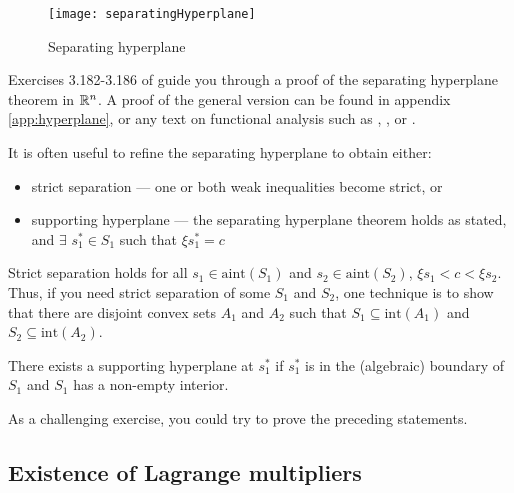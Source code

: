 \begin{figure}\caption{Separating hyperplane \label{fig:sht}}
  \begin{centering}
    \texttt{[image: separatingHyperplane]}
  \end{centering}
\end{figure}

Exercises 3.182-3.186 of \cite{carter2001} guide you through a proof
of the separating hyperplane theorem in $\mathbb{R}^n$. A proof of the general
version can be found in appendix \ref{app:hyperplane}, or any text on
functional analysis such as \cite{luenberger1969}, \cite{clarke2013},
or \cite{holmes1975}. 

\begin{remark}
  It is often useful to refine the separating hyperplane to obtain
  either:
  \begin{itemize}
  \item strict separation --- one or both weak inequalities become
    strict, or 
  \item supporting hyperplane --- the separating hyperplane theorem
    holds as stated, and $\exists$ $s^*_1 \in S_1$ such that $\xi
    s^*_1 = c$
  \end{itemize}
  Strict separation holds for all $s_1 \in \mathrm{aint}(S_1)$ and $s_2
  \in \mathrm{aint}(S_2)$, $\xi s_1 < c < \xi s_2$. Thus, if you need
  strict separation of some $S_1$ and $S_2$, one technique is to show
  that there are disjoint convex sets $A_1$ and $A_2$ such that $S_1
  \subseteq \mathrm{int}(A_1)$ and $S_2 \subseteq \mathrm{int}(A_2)$.

  There exists a supporting hyperplane at $s_1^*$ if $s_1^*$ is in the
  (algebraic) boundary of $S_1$ and $S_1$ has a non-empty interior.

  As a challenging exercise, you could try to prove the preceding
  statements. 
\end{remark}

\subsection{Existence of Lagrange multipliers}

